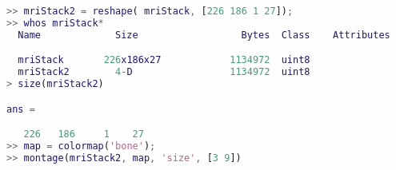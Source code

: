 \begin{lstlisting}[language=matlab]
>> mriStack2 = reshape( mriStack, [226 186 1 27]);
>> whos mriStack*
  Name             Size                  Bytes  Class    Attributes

  mriStack       226x186x27            1134972  uint8              
  mriStack2        4-D                 1134972  uint8 
> size(mriStack2)

ans =

   226   186     1    27
>> map = colormap('bone');
>> montage(mriStack2, map, 'size', [3 9])

\end{lstlisting}